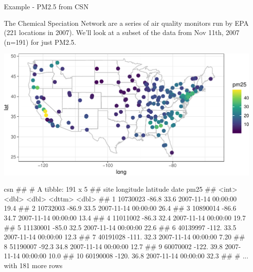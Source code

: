 \documentclass[11pt,ignorenonframetext,]{beamer}
\newenvironment{Shaded}{}{}
\newcommand{\NormalTok}[1]{#1}
\let\oldShaded\Shaded
\let\endoldShaded\endShaded
\renewenvironment{Shaded}{\footnotesize\begin{spacing}{0.9}\oldShaded}{\endoldShaded\end{spacing}}
\begin{document}
\begin{frame}{Example - PM2.5 from CSN}
\protect\hypertarget{example---pm2.5-from-csn}{}

The Chemical Speciation Network are a series of air quality monitors run
by EPA (221 locations in 2007). We’ll look at a subset of the data from
Nov 11th, 2007 (n=191) for just PM2.5.

\begin{center}\includegraphics[width=\textwidth]{Lec19_files/figure-beamer/unnamed-chunk-30-1} \end{center}

\end{frame}

\begin{frame}[fragile]{}
\protect\hypertarget{section-2}{}

\begin{Shaded}
\begin{Highlighting}[]
\NormalTok{csn}
\NormalTok{## # A tibble: 191 x 5}
\NormalTok{##        site longitude latitude date                 pm25}
\NormalTok{##       <int>     <dbl>    <dbl> <dttm>              <dbl>}
\NormalTok{##  1 10730023     -86.8     33.6 2007-11-14 00:00:00 19.4 }
\NormalTok{##  2 10732003     -86.9     33.5 2007-11-14 00:00:00 26.4 }
\NormalTok{##  3 10890014     -86.6     34.7 2007-11-14 00:00:00 13.4 }
\NormalTok{##  4 11011002     -86.3     32.4 2007-11-14 00:00:00 19.7 }
\NormalTok{##  5 11130001     -85.0     32.5 2007-11-14 00:00:00 22.6 }
\NormalTok{##  6 40139997    -112.      33.5 2007-11-14 00:00:00 12.3 }
\NormalTok{##  7 40191028    -111.      32.3 2007-11-14 00:00:00  7.20}
\NormalTok{##  8 51190007     -92.3     34.8 2007-11-14 00:00:00 12.7 }
\NormalTok{##  9 60070002    -122.      39.8 2007-11-14 00:00:00 10.0 }
\NormalTok{## 10 60190008    -120.      36.8 2007-11-14 00:00:00 32.3 }
\NormalTok{## # ... with 181 more rows}
\end{Highlighting}
\end{Shaded}

\end{frame}
\end{document}
